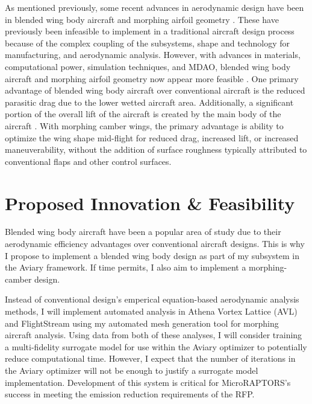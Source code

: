 \documentclass[conf]{new-aiaa}
\begin{document}
As mentioned previously, some recent advances in aerodynamic design have been in blended wing body aircraft \cite{handa_recent_2022} and morphing airfoil geometry \cite{coelho_barbosa_aircraft_2023}. These have previously been infeasible to implement in a traditional aircraft design process because of the complex coupling of the subsystems, shape and technology for manufacturing, and aerodynamic analysis. However, with advances in materials, computational power, simulation techniques, and MDAO, blended wing body aircraft and morphing airfoil geometry now appear more feasible \cite{majid_status_2021, handa_recent_2022}. One primary advantage of blended wing body aircraft over conventional aircraft is the reduced parasitic drag due to the lower wetted aircraft area. Additionally, a significant portion of the overall lift of the aircraft is created by the main body of the aircraft \cite{handa_recent_2022}. With morphing camber wings, the primary advantage is ability to optimize the wing shape mid-flight for reduced drag, increased lift, or increased maneuverability, without the addition of surface roughness typically attributed to conventional flaps and other control surfaces.

\section{Proposed Innovation \& Feasibility}
Blended wing body aircraft have been a popular area of study due to their aerodynamic efficiency advantages over conventional aircraft designs. This is why I propose to implement a blended wing body design as part of my subsystem in the Aviary framework. If time permits, I also aim to implement a morphing-camber design. 

Instead of conventional design's emperical equation-based aerodynamic analysis methods, I will implement automated analysis in Athena Vortex Lattice (AVL) and FlightStream using my automated mesh generation tool for morphing aircraft analysis. Using data from both of these analyses, I will consider training a multi-fidelity surrogate model for use within the Aviary optimizer to potentially reduce computational time. However, I expect that the number of iterations in the Aviary optimizer will not be enough to justify a surrogate model implementation. Development of this system is critical for MicroRAPTORS's success in meeting the emission reduction requirements of the RFP.




\end{document}
